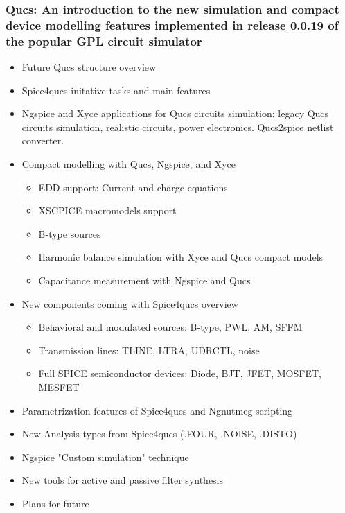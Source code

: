 \documentclass[9pt]{beamer}
\begin{document}
\begin{frame}
 \frametitle{Qucs: An introduction to the new simulation and compact device 
modelling features implemented in release 0.0.19 of the popular GPL circuit 
simulator}
\small

\begin{itemize}
 \item Future Qucs structure overview
 \item Spice4qucs initative tasks and main features
 \item Ngspice and Xyce applications for Qucs circuits simulation: 
legacy Qucs circuits simulation, realistic circuits, power electronics. 
Qucs2spice netlist converter.
 \item Compact modelling with Qucs, Ngspice, and Xyce
 \begin{itemize}
  \item EDD support: Current and charge equations
  \item XSCPICE macromodels support
  \item B-type sources
  \item Harmonic balance simulation with Xyce and Qucs compact models
  \item Capacitance measurement with Ngspice and Qucs
 \end{itemize}
 \item {New components coming with Spice4qucs overview }
 \begin{itemize}
  \item Behavioral and modulated sources: B-type, PWL, AM, SFFM
  \item Transmission lines: TLINE, LTRA, UDRCTL, noise
  \item Full SPICE semiconductor devices: Diode, BJT, JFET, MOSFET, MESFET
 \end{itemize}
  \item Parametrization features of Spice4qucs and Ngnutmeg scripting
  \item New Analysis types from Spice4qucs (.FOUR, .NOISE, .DISTO)
  \item Ngspice "Custom simulation" technique
  \item New tools for active and passive filter synthesis
  \item Plans for future



\end{itemize}


\end{frame}
\end{document}

